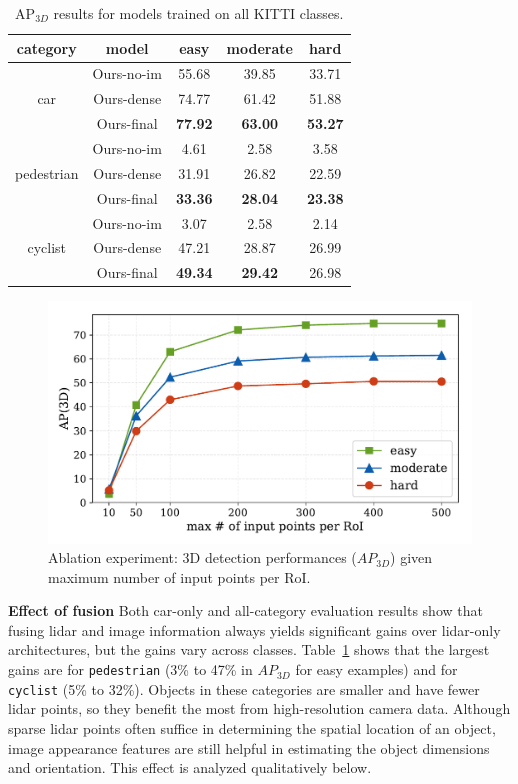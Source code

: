 \documentclass[10pt,twocolumn,letterpaper]{article}
\begin{document}
\begin{table}[t!]
\centering
\caption{AP$_{3D}$ results for models trained on all KITTI classes.}
\label{table:kitti-all}
\begin{tabular}{c|cccc}
\hline
category                    & model & easy  & moderate & hard  \\ \hline
\multirow{3}{*}{car}        & Ours-no-im & 55.68 & 39.85    & 33.71  \\
                            & Ours-dense & 74.77 & 61.42    & 51.88 \\
                            & Ours-final & \textbf{77.92} & \textbf{63.00}    & \textbf{53.27} \\ \hline
\multirow{3}{*}{pedestrian} & Ours-no-im & 4.61  & 2.58     & 3.58 \\
                            & Ours-dense & 31.91 & 26.82    & 22.59 \\
                            & Ours-final & \textbf{33.36} & \textbf{28.04}    & \textbf{23.38} \\ \hline
\multirow{3}{*}{cyclist}    & Ours-no-im & 3.07  & 2.58     &  2.14 \\
                            & Ours-dense & 47.21 & 28.87    & 26.99 \\
                            & Ours-final & \textbf{49.34} & \textbf{29.42}    & 26.98 \\ \hline
\end{tabular}
\end{table}

\begin{figure}[]
\centering
\includegraphics[width=0.8\linewidth]{num_point.pdf}
\caption{Ablation experiment: 3D detection performances ($AP_{3D}$) given maximum number of input points per RoI.}
\label{fig:num-point}
\end{figure}

\noindent\textbf{Effect of fusion} Both car-only and all-category evaluation results show that fusing lidar and image information always yields significant gains over lidar-only architectures, but the gains vary across classes. Table~\ref{table:kitti-all} shows that the largest gains are for \texttt{pedestrian} (3\% to 47\% in $AP_{3D}$ for easy examples) and for \texttt{cyclist} (5\% to 32\%). Objects in these categories are smaller and have fewer lidar points, so they benefit the most from high-resolution camera data. Although sparse lidar points often suffice in determining the spatial location of an object, image appearance features are still helpful in estimating the object dimensions and orientation. This effect is analyzed qualitatively below.
\end{document}

